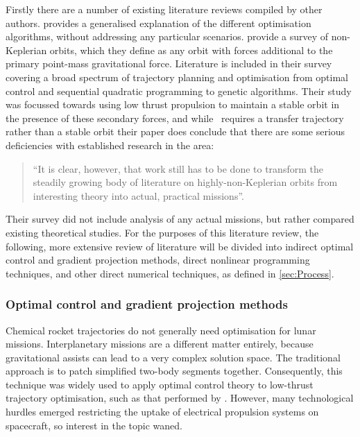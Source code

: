 Firstly there are a number of existing literature reviews compiled by other authors. \textcite{Betts1998} provides a generalised explanation of the different optimisation algorithms, without addressing any particular scenarios. \textcite{McKay2011} provide a survey of non-Keplerian orbits, which they define as any orbit with forces additional to the primary point-mass gravitational force. Literature is included in their survey covering a broad spectrum of trajectory planning and optimisation from optimal control and sequential quadratic programming to genetic algorithms. Their study was focussed towards using low thrust propulsion to maintain a stable orbit in the presence of these secondary forces, and while \BW\ requires a transfer trajectory rather than a stable orbit their paper does conclude that there are some serious deficiencies with established research in the area: 

\begin{quotation}\enquote{It is clear, however, that work still has to be done to transform the steadily growing body of literature on highly-non-Keplerian orbits from interesting theory into actual, practical missions}\parencite[p.663]{McKay2011}.
\end{quotation}

Their survey did not include analysis of any actual missions, but rather compared existing theoretical studies. For the purposes of this literature review, the following, more extensive review of literature will be divided into indirect optimal control and gradient projection methods, direct nonlinear programming techniques, and other direct numerical techniques, as defined in \autoref{sec:Process}.






\subsubsection{Optimal control and gradient projection methods} \label{sub:Optimal-control-lit}

Chemical rocket trajectories do not generally need optimisation for lunar missions. Interplanetary missions are a different matter entirely, because gravitational assists can lead to a very complex solution space. The traditional approach is to patch simplified two-body segments together. Consequently, this technique was widely used to apply optimal control theory to low-thrust trajectory optimisation, such as that performed by \textcite{Stuhlinger1964}. However, many technological hurdles emerged restricting the uptake of electrical propulsion systems on spacecraft, so interest in the topic waned.

